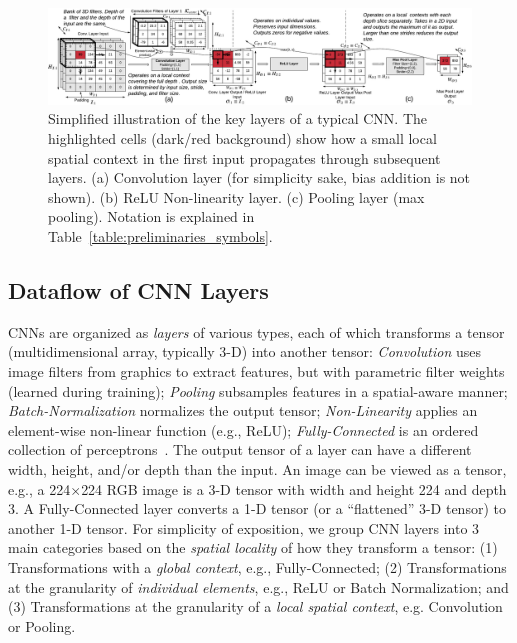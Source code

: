\begin{figure}[t]
\vspace{-2mm}
\includegraphics[width=\textwidth]{images/cnn_simplified}
\vspace{-6mm}
\caption{Simplified illustration of the key layers of a typical CNN. The highlighted cells (dark/red background) show how a small local spatial context in the first input propagates through subsequent layers. (a) Convolution layer (for simplicity sake, bias addition is not shown). (b) ReLU Non-linearity layer. (c) Pooling layer (max pooling). Notation is explained in Table~\ref{table:preliminaries_symbols}.}
\vspace{-2mm}
\label{fig:cnn_simplified}
\end{figure}

\subsection{Dataflow of CNN Layers}\label{sec:cnn_internals}
CNNs are organized as \textit{layers} of various types, each of which transforms a tensor (multidimensional array, typically 3-D) into another tensor: \textit{Convolution} uses image filters from graphics to extract features, but with parametric filter weights (learned during training); \textit{Pooling} subsamples features in a spatial-aware manner; \textit{Batch-Normalization} normalizes the output tensor; \textit{Non-Linearity} applies an element-wise non-linear function (e.g., ReLU); \textit{Fully-Connected} is an ordered collection of perceptrons~\cite{dlbook}. The output tensor of a layer can have a different width, height, and/or depth than the input. An image can be viewed as a tensor, e.g., a 224$\times$224 RGB image is a 3-D tensor with width and height 224 and depth 3. A Fully-Connected layer converts a 1-D tensor (or a ``flattened'' 3-D tensor) to another 1-D tensor. For simplicity of exposition, we group CNN layers into 3 main categories based on the \textit{spatial locality} of how they transform a tensor: (1) Transformations with a \textit{global context}, e.g., Fully-Connected; (2) Transformations at the granularity of \textit{individual elements}, e.g., ReLU or Batch Normalization; and (3) Transformations at the granularity of a \textit{local spatial context}, e.g. Convolution or Pooling.

